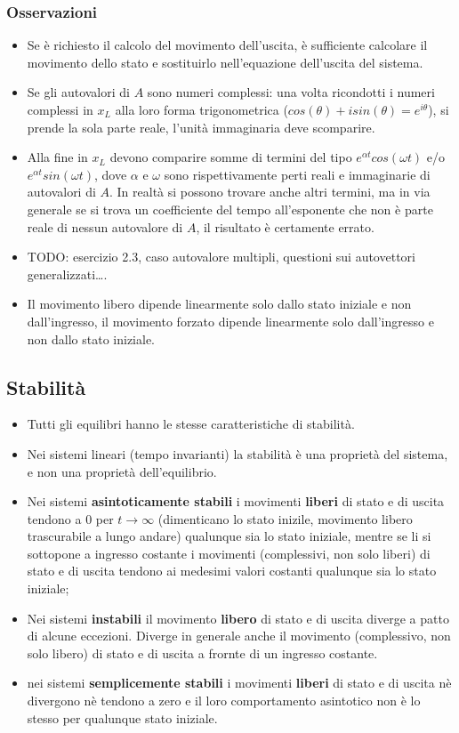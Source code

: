 \begin{landscape}
\begin{multicols*}{3}
    \subsubsection*{Osservazioni}
    \begin{itemize}
        \item Se è richiesto il calcolo del movimento dell'uscita, è sufficiente calcolare il movimento dello stato e sostituirlo nell'equazione dell'uscita del sistema.
        \item Se gli autovalori di $A$ sono numeri complessi: una volta ricondotti i numeri complessi in $x_L$ alla loro forma trigonometrica ($cos(\theta) + i sin(\theta) = e^{i \theta}$), si prende la sola parte reale, l'unità immaginaria deve scomparire.
        \item Alla fine in $x_L$ devono comparire somme di termini del tipo $e^{\alpha t} cos(\omega t)$ e/o $e^{\alpha t} sin(\omega t)$, dove $\alpha$ e $\omega$ sono rispettivamente perti reali e immaginarie di autovalori di $A$. In realtà si possono trovare anche altri termini, ma in via generale se si trova un coefficiente del tempo all'esponente che non è parte reale di nessun autovalore di $A$, il risultato è certamente errato.
        \item TODO: esercizio 2.3, caso autovalore multipli, questioni sui autovettori generalizzati\dots.
        \item Il movimento libero dipende linearmente solo dallo stato iniziale e non dall’ingresso, il movimento forzato dipende linearmente solo dall’ingresso e non dallo stato iniziale.
    \end{itemize}
    \subsection*{Stabilità}
    \begin{itemize}
        \item Tutti gli equilibri hanno le stesse caratteristiche di stabilità.
        \item Nei sistemi lineari (tempo invarianti) la stabilità è una proprietà del sistema, e non una proprietà dell’equilibrio. 
        \item Nei sistemi \textbf{asintoticamente stabili} i movimenti \textbf{liberi} di stato e di uscita tendono a $0$ per $t \rightarrow \infty$ (dimenticano lo stato inizile, movimento libero trascurabile a lungo andare) qualunque sia lo stato iniziale, mentre se li si sottopone a ingresso costante i movimenti (complessivi, non solo liberi) di stato e di uscita tendono ai medesimi valori costanti qualunque sia lo stato iniziale;
        \item Nei sistemi \textbf{instabili} il movimento \textbf{libero} di stato e di uscita diverge a patto di alcune eccezioni. Diverge in generale anche il movimento (complessivo, non solo libero) di stato e di uscita a frornte di un ingresso costante.
        \item nei sistemi \textbf{semplicemente stabili} i movimenti \textbf{liberi} di stato e di uscita nè divergono nè tendono a zero e il loro comportamento asintotico non è lo stesso per qualunque stato iniziale.
    \end{itemize}

\end{multicols*}
\end{landscape}
